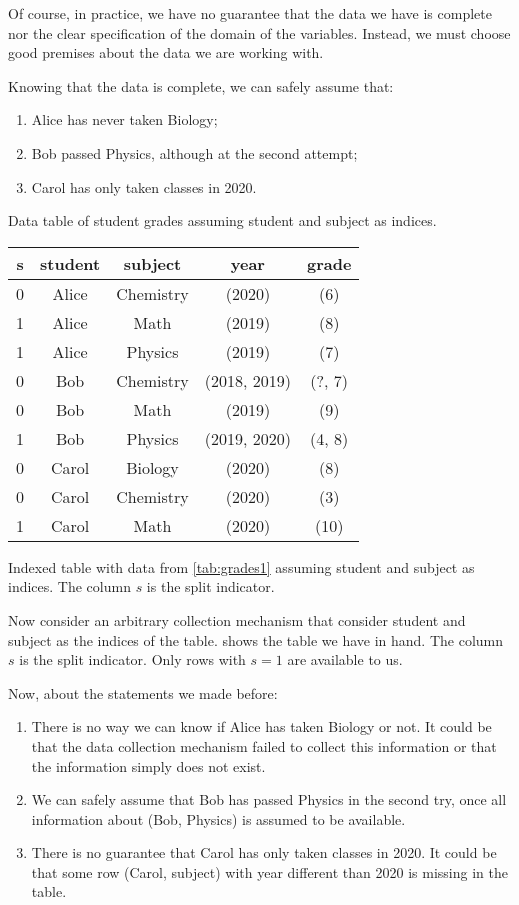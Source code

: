 Of course, in practice, we have no guarantee that the data we have is complete nor the
clear specification of the domain of the variables.  Instead, we must choose good
premises about the data we are working with.

Knowing that the data is complete, we can safely assume that:
\begin{enumerate}
  \itemsep0em
  \item Alice has never taken Biology;
  \item Bob passed Physics, although at the second attempt;
  \item Carol has only taken classes in 2020.
\end{enumerate}

\begin{tablebox}[label=tab:grades2]{Data table of student grades assuming student and subject as indices.}
  \centering
  \begin{tabular}{ccccc}
    \toprule
    \textbf{s} & \textbf{student} & \textbf{subject} & \textbf{year} & \textbf{grade} \\
    \midrule
    0 & Alice & Chemistry & (2020) & (6) \\
    1 & Alice & Math & (2019) & (8) \\
    1 & Alice & Physics & (2019) & (7) \\
    0 & Bob & Chemistry & (2018, 2019) & (?, 7) \\
    0 & Bob & Math & (2019) & (9) \\
    1 & Bob & Physics & (2019, 2020) & (4, 8) \\
    0 & Carol & Biology & (2020) & (8) \\
    0 & Carol & Chemistry & (2020) & (3) \\
    1 & Carol & Math & (2020) & (10) \\
    \bottomrule
  \end{tabular}
  \tcblower
  Indexed table with data from \cref{tab:grades1} assuming student and
  subject as indices.  The column $s$ is the split indicator.
\end{tablebox}

Now consider an arbitrary collection mechanism that consider student and subject as the
indices of the table.   shows the table we have in hand.  The column $s$
is the split indicator.  Only rows with $s = 1$ are available to us.

Now, about the statements we made before:
\begin{enumerate}
  \itemsep0em
  \item There is no way we can know if Alice has taken Biology or not.  It could be that
    the data collection mechanism failed to collect this information or that the
    information simply does not exist.
  \item We can safely assume that Bob has passed Physics in the second try, once all
    information about (Bob, Physics) is assumed to be available.
  \item There is no guarantee that Carol has only taken classes in 2020.  It could be that
    some row (Carol, subject) with year different than 2020 is missing in the table.
\end{enumerate}

